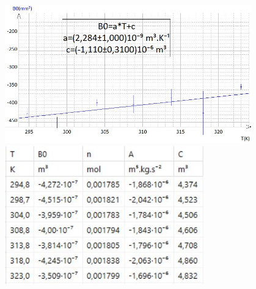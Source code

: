 \documentclass[12pt,a4paper]{article}
\begin{document}
\pagebreak
\begin{bigcenter}
\begin{multicols}{2}
\includegraphics[height=6cm]{B0(T)}
\columnbreak
\includegraphics[height=6cm]{Viriel}
\end{multicols}
\end{bigcenter}
\end{document}
